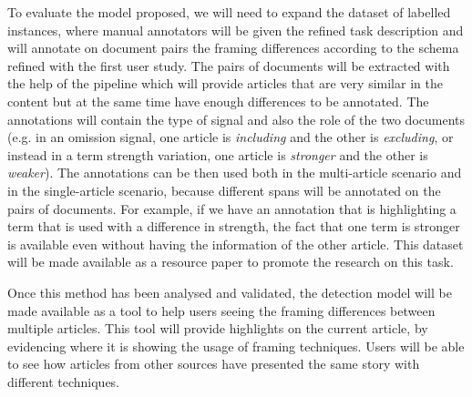 To evaluate the model proposed, we will need to expand the dataset of labelled instances, where manual annotators will be given the refined task description and will annotate on document pairs the framing differences according to the schema refined with the first user study.
The pairs of documents will be extracted with the help of the pipeline which will provide articles that are very similar in the content but at the same time have enough differences to be annotated. %
The annotations will contain the type of signal and also the role of the two documents (e.g. in an omission signal, one article is \textit{including} and the other is \textit{excluding}, or instead in a term strength variation, one article is \textit{stronger} and the other is \textit{weaker}).
The annotations can be then used both in the multi-article scenario and in the single-article scenario, because different spans will be annotated on the pairs of documents.
For example, if we have an annotation that is highlighting a term that is used with a difference in strength, the fact that one term is stronger is available even without having the information of the other article.
This dataset will be made available as a resource paper to promote the research on this task.

Once this method has been analysed and validated, the detection model will be made available as a tool to help users seeing the framing differences between multiple articles.
This tool will provide highlights on the current article, by evidencing where it is showing the usage of framing techniques. Users will be able to see how articles from other sources have presented the same story with different techniques.





